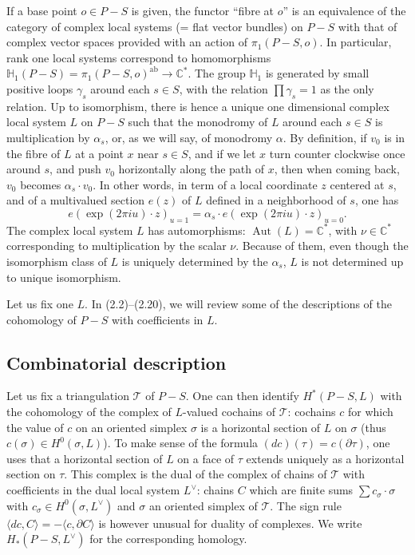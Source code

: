 \documentclass[12pt,a4paper]{article}
\theoremstyle{plain}
\theoremstyle{definition}
\theoremstyle{remark}
\DeclareMathOperator{\Aut}{Aut}
\newcommand{\CC}{\mathbb{C}}
\newcommand{\HH}{\mathbb{H}}
\numberwithin{equation}{section}
\providecommand{\CC}{\mathbb{C}}
\providecommand{\HH}{\mathbb{H}}
\providecommand{\Aut}{\operatorname{Aut}}
\begin{document}
If a base point $o \in P - S$ is given, the functor ``fibre at $o$'' is an equivalence of the category of complex local systems (= flat vector bundles) on $P - S$ with that of complex vector spaces provided with an action of $\pi_1(P-S, o)$. In particular, rank one local systems correspond to homomorphisms $\HH_1(P-S) = \pi_1(P-S, o)^{\mathrm{ab}} \to \CC^*$. The group $\HH_1$ is generated by small positive loops $\gamma_s$ around each $s \in S$, with the relation $\prod \gamma_s = 1$ as the only relation. Up to isomorphism, there is hence a unique one dimensional complex local system $L$ on $P-S$ such that the monodromy of $L$ around each $s \in S$ is multiplication by $\alpha_s$, or, as we will say, of monodromy $\alpha$. By definition, if $v_0$ is in the fibre of $L$ at a point $x$ near $s \in S$, and if we let $x$ turn counter clockwise once around $s$, and push $v_0$ horizontally along the path of $x$, then when coming back, $v_0$ becomes $\alpha_s \cdot v_0$. In other words, in term of a local coordinate $z$ centered at $s$, and of a multivalued section $e(z)$ of $L$ defined in a neighborhood of $s$, one has
\[
e(\exp(2\pi i u) \cdot z)_{u=1} = \alpha_s \cdot e(\exp(2\pi i u) \cdot z)_{u=0}.
\]
The complex local system $L$ has automorphisms: $\Aut(L) = \CC^*$, with $\nu \in \CC^*$ corresponding to multiplication by the scalar $\nu$. Because of them, even though the isomorphism class of $L$ is uniquely determined by the $\alpha_s$, $L$ is not determined up to unique isomorphism.

Let us fix one $L$. In (2.2)--(2.20), we will review some of the descriptions of the cohomology of $P-S$ with coefficients in $L$.

\subsection{Combinatorial description}
Let us fix a triangulation $\mathscr{T}$ of $P-S$. One can then identify $H^*(P-S, L)$ with the cohomology of the complex of $L$-valued cochains of $\mathscr{T}$: cochains $c$ for which the value of $c$ on an oriented simplex $\sigma$ is a horizontal section of $L$ on $\sigma$ (thus $c(\sigma) \in H^0(\sigma, L)$). To make sense of the formula $(dc)(\tau) = c(\partial \tau)$, one uses that a horizontal section of $L$ on a face of $\tau$ extends uniquely as a horizontal section on $\tau$. This complex is the dual of the complex of chains of $\mathscr{T}$ with coefficients in the dual local system $L^\vee$: chains $C$ which are finite sums $\sum c_\sigma \cdot \sigma$ with $c_\sigma \in H^0(\sigma, L^\vee)$ and $\sigma$ an oriented simplex of $\mathscr{T}$. The sign rule $\langle dc, C \rangle = -\langle c, \partial C \rangle$ is however unusual for duality of complexes. We write $H_*(P-S, L^\vee)$ for the corresponding homology.
\end{document}
